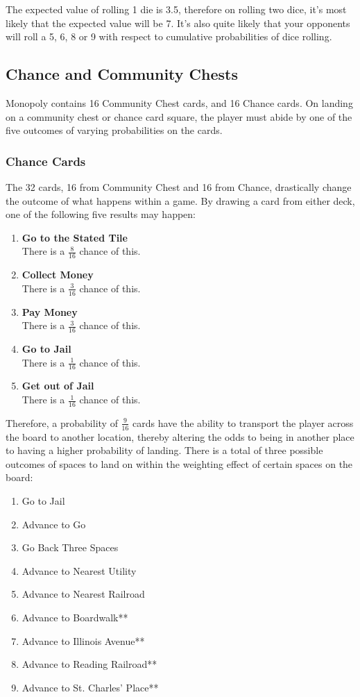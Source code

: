 \documentclass[12pt]{article}
\begin{document}
The expected value of rolling 1 die is 3.5, therefore on rolling two dice, it's most likely that the expected value will be 7. It's also quite likely that your opponents will roll a 5, 6, 8 or 9 with respect to cumulative probabilities of dice rolling.
\subsection{Chance and Community Chests}
Monopoly contains 16 Community Chest cards, and 16 Chance cards. On landing on a community chest or chance card square, the player must abide by one of the five outcomes of varying probabilities on the cards.

\subsubsection{Chance Cards}
The 32 cards, 16 from Community Chest and 16 from Chance, drastically change the outcome of what happens within a game. By drawing a card from either deck, one of the following five results may happen:
\begin{enumerate}
  \item \textbf{Go to the Stated Tile} \hfill\\
  There is a $\frac{8}{16}$ chance of this.
  \item \textbf{Collect Money} \hfill\\
  There is a $\frac{3}{16}$ chance of this.
  \item \textbf{Pay Money} \hfill\\
  There is a $\frac{3}{16}$ chance of this.
  \item \textbf{Go to Jail} \hfill\\
  There is a $\frac{1}{16}$ chance of this.
  \item \textbf{Get out of Jail} \hfill\\
  There is a $\frac{1}{16}$ chance of this.
\end{enumerate}
Therefore, a probability of $\frac{9}{16}$ cards have the ability to transport the player across the board to another location, thereby altering the odds to being in another place to having a higher probability of landing. There is a total of three possible outcomes of spaces to land on within the weighting effect of certain spaces on the board:
\begin{enumerate}
  \item {Go to Jail}
  \item {Advance to Go}
  \item {Go Back Three Spaces} \hfill
  \item {Advance to Nearest Utility} \hfill
  \item {Advance to Nearest Railroad} \hfill
  \item {Advance to Boardwalk**} \hfill
  \item {Advance to Illinois Avenue**} \hfill
  \item {Advance to Reading Railroad**} \hfill
  \item {Advance to St. Charles' Place**} \hfill
\end{enumerate}
\end{document}
